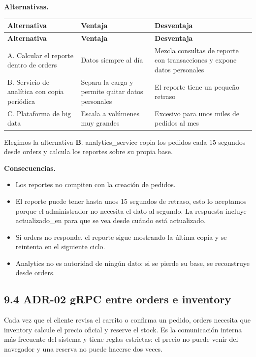 \documentclass[10pt,letterpaper]{article}
\begin{document}
\textbf{Alternativas.}

{\footnotesize
\begin{longtable}{|P{\tabcolsep\relax}|P{\tabcolsep\relax}|P{\tabcolsep\relax}|}
\hline
\textbf{Alternativa} & \textbf{Ventaja} & \textbf{Desventaja} \\ \hline
\endfirsthead
\hline
\textbf{Alternativa} & \textbf{Ventaja} & \textbf{Desventaja} \\ \hline
\endhead
A. Calcular el reporte dentro de orders & Datos siempre al día & Mezcla consultas de reporte con transacciones y expone datos personales \\ \hline
B. Servicio de analítica con copia periódica  & Separa la carga y permite quitar datos personales & El reporte tiene un pequeño retraso \\ \hline
C. Plataforma de big data & Escala a volúmenes muy grandes & Excesivo para unos miles de pedidos al mes \\ \hline
\end{longtable}}
Elegimos la alternativa \textbf{B}. analytics\_\allowbreak{}service copia los pedidos cada 15 segundos desde orders y calcula los reportes sobre su propia base.

\textbf{Consecuencias.}

\begin{itemize}
\item Los reportes no compiten con la creación de pedidos.
\item El reporte puede tener hasta unos 15 segundos de retraso, esto lo aceptamos porque el administrador no necesita el dato al segundo. La respuesta incluye actualizado\_\allowbreak{}en para que se vea desde cuándo está actualizado.
\item Si orders no responde, el reporte sigue mostrando la última copia y se reintenta en el siguiente ciclo.
\item Analytics no es autoridad de ningún dato: si se pierde su base, se reconstruye desde orders.
\end{itemize}

\subsection*{9.4 ADR-02 gRPC entre orders e inventory}
Cada vez que el cliente revisa el carrito o confirma un pedido, orders necesita que inventory calcule el precio oficial y reserve el stock. Es la comunicación interna más frecuente del sistema y tiene reglas estrictas: el precio no puede venir del navegador y una reserva no puede hacerse dos veces.
\end{document}
